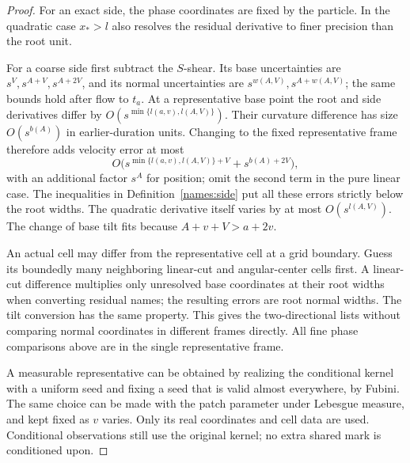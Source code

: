\begin{proof}
For an exact side, the phase coordinates are fixed by the particle.
In the quadratic case \(x_*>l\) also resolves the residual
derivative to finer precision than the root unit.

For a coarse side first subtract the \(S\)-shear. Its base
uncertainties are \(s^V,s^{A+V},s^{A+2V}\), and its normal
uncertainties are \(s^{w(A,V)},s^{A+w(A,V)}\); the same bounds
hold after flow to \(t_a\). At a representative base point the
root and side derivatives differ by
\(O(s^{\min\{l(a,v),l(A,V)\}})\). Their curvature difference
has size \(O(s^{b(A)})\) in earlier-duration units. Changing to
the fixed representative frame therefore adds velocity error at
most
\[
 O\big(s^{\min\{l(a,v),l(A,V)\}+V}+s^{b(A)+2V}\big),
\]
with an additional factor \(s^A\) for position; omit the second
term in the pure linear case. The inequalities in
Definition~\ref{names:side} put all these errors strictly below
the root widths. The quadratic derivative itself varies by at
most \(O(s^{l(A,V)})\). The change of base tilt fits because
\(A+v+V>a+2v\).

An actual cell may differ from the representative cell at a grid
boundary. Guess its boundedly many neighboring linear-cut and
angular-center cells first. A linear-cut difference multiplies
only unresolved base coordinates at their root widths when
converting residual names; the resulting errors are root normal
widths. The tilt conversion has the same property. This gives
the two-directional lists without comparing normal coordinates
in different frames directly. All fine phase comparisons above
are in the single representative frame.

A measurable representative can be obtained by realizing the
conditional kernel with a uniform seed and fixing a seed that
is valid almost everywhere, by Fubini. The same choice can be
made with the patch parameter under Lebesgue measure, and kept
fixed as \(v\) varies. Only its real coordinates and cell data
are used. Conditional observations still use the original
kernel; no extra shared mark is conditioned upon.
\end{proof}

